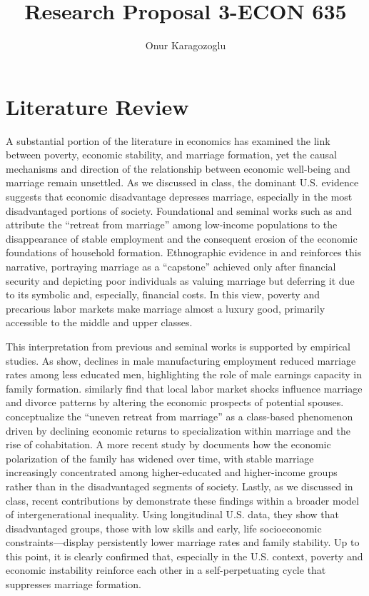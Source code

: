 

\title{Research Proposal 3-ECON 635}
\author{Onur Karagozoglu}
\date{}
\doublespacing



\maketitle

\section*{Literature Review}

A substantial portion of the literature in economics has examined the link between poverty, economic stability, and marriage formation, yet the causal mechanisms and direction of the relationship between economic well-being and marriage remain unsettled. As we discussed in class, the dominant U.S. evidence suggests that economic disadvantage depresses marriage, especially in the most disadvantaged portions of society. Foundational and seminal works such as \citet{Wilson1987} and \citet{Murray1994} attribute the ``retreat from marriage'' among low-income populations to the disappearance of stable employment and the consequent erosion of the economic foundations of household formation. Ethnographic evidence in \citet{EdinKefalas2005} and \citet{Cherlin2004} reinforces this narrative, portraying marriage as a ``capstone'' achieved only after financial security and depicting poor individuals as valuing marriage but deferring it due to its symbolic and, especially, financial costs. In this view, poverty and precarious labor markets make marriage almost a luxury good, primarily accessible to the middle and upper classes. 

This interpretation from previous and seminal works is supported by empirical studies. As \citet{Autor2019} show, declines in male manufacturing employment reduced marriage rates among less educated men, highlighting the role of male earnings capacity in family formation. \citet{GouldPaserman2003} similarly find that local labor market shocks influence marriage and divorce patterns by altering the economic prospects of potential spouses. \citet{LundbergPollak2007} conceptualize the ``uneven retreat from marriage'' as a class-based phenomenon driven by declining economic returns to specialization within marriage and the rise of cohabitation. A more recent study by \citet{BlauKahnWaldfogel2013} documents how the economic polarization of the family has widened over time, with stable marriage increasingly concentrated among higher-educated and higher-income groups rather than in the disadvantaged segments of society. Lastly, as we discussed in class, recent contributions by \citet{GarciaHeckman2023} demonstrate these findings within a broader model of intergenerational inequality. Using longitudinal U.S. data, they show that disadvantaged groups, those with low skills and early, life socioeconomic constraints—display persistently lower marriage rates and family stability. Up to this point, it is clearly confirmed that, especially in the U.S. context, poverty and economic instability reinforce each other in a self-perpetuating cycle that suppresses marriage formation.

